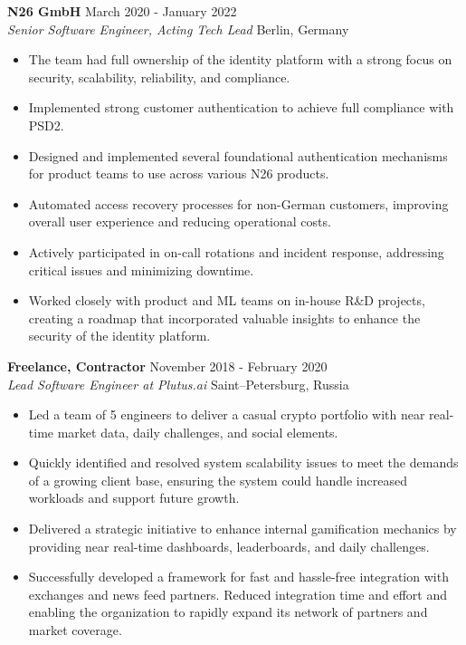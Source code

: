 \documentclass[a4paper]{article}
\newcommand{\employer} [4] {
    \textbf{#1} \hfill {#3} \\
    \textit{#2} \hfill {#4} \\
    \vspace{0mm}
}
\begin{document}
    \employer{N26 GmbH}{Senior Software Engineer, Acting Tech Lead}{March 2020 - January 2022}{Berlin, Germany}
    \begin{itemize}[itemsep=-1mm]
        \item The team had full ownership of the identity platform with a strong focus on security, scalability, reliability, and compliance.
        \item Implemented strong customer authentication to achieve full compliance with PSD2.
        \item Designed and implemented several foundational authentication mechanisms for product teams to use across various N26 products.
        \item Automated access recovery processes for non-German customers, improving overall user experience and reducing operational costs.
        \item Actively participated in on-call rotations and incident response, addressing critical issues and minimizing downtime.
        \item Worked closely with product and ML teams on in-house R\&D projects, creating a roadmap that
        incorporated valuable insights to enhance the security of the identity platform.
    \end{itemize}

    \employer{Freelance, Contractor}{Lead Software Engineer at Plutus.ai}{November 2018 - February 2020}{Saint–Petersburg, Russia}
    \begin{itemize}[itemsep=-1mm]
        \item Led a team of 5 engineers to deliver a casual crypto portfolio with near real-time market data, daily challenges, and social elements.
        \item Quickly identified and resolved system scalability issues to meet the demands of a growing client base, ensuring the system could handle increased workloads and support future growth.
        \item Delivered a strategic initiative to enhance internal gamification mechanics by providing near real-time dashboards, leaderboards,
        and daily challenges.
        \item Successfully developed a framework for fast and hassle-free integration with exchanges and news feed partners.
        Reduced integration time and effort and enabling the organization to rapidly expand its network of partners and market coverage.
    \end{itemize}
\end{document}
